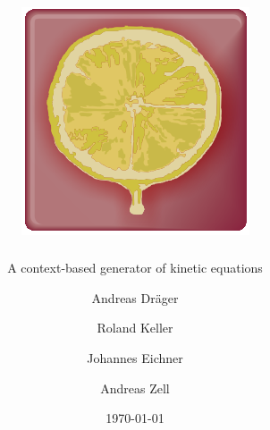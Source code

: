 \documentclass[
  BCOR12mm,
  letterpaper,
  11pt,
  headsepline,
  pointlessnumbers,
  tablecaptionabove,
  onelinecaption,
  headinclude,
  appendixprefix,
  idxtotoc,
  bibtotoc,
  twoside,
  titlepage
]{scrreprt}
\title{\includegraphics[width=.75\textwidth]{img/LOGO}}
\subtitle{A context-based generator of kinetic equations}
\author{Andreas Dr\"ager%
\and
Roland Keller\and
Johannes Eichner\and
Andreas Zell}
\date{\today}
\begin{document}
% 
% 
%
\maketitle
\begin{abstract}

\end{abstract}
%
\setcounter{tocdepth}{1}
\tableofcontents		%

\cleardoublepage		%


% 
% 
% 
% 
% 


% 
\appendix



\printindex
\end{document}
